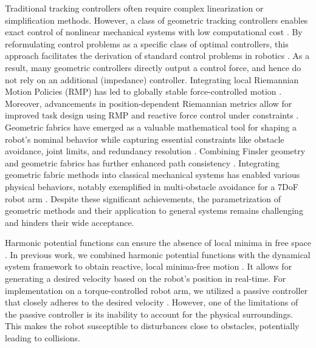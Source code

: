 Traditional tracking controllers often require complex linearization or simplification methods. However, a class of geometric tracking controllers enables exact control of nonlinear mechanical systems with low computational cost \parencite{udwadia2003new}. By reformulating control problems as a specific class of optimal controllers, this approach facilitates the derivation of standard control problems in robotics \parencite{peters2008unifying}. As a result, many geometric controllers directly output a control force, and hence do not rely on an additional (impedance) controller.
Integrating local Riemannian Motion Policies (RMP) has led to globally stable force-controlled motion \parencite{cheng2020rmp}. Moreover, advancements in position-dependent Riemannian metrics allow for improved task design using RMP and reactive force control under constraints \parencite{bylard2021composable}.
Geometric fabrics have emerged as a valuable mathematical tool for shaping a robot's nominal behavior while capturing essential constraints like obstacle avoidance, joint limits, and redundancy resolution \parencite{xie2020geometric}. Combining Finsler geometry and geometric fabrics has further enhanced path consistency \parencite{ratliff2021generalized}.
Integrating geometric fabric methods into classical mechanical systems has enabled various physical behaviors, notably exemplified in multi-obstacle avoidance for a 7DoF robot arm \parencite{van2022geometric}. Despite these significant achievements, the parametrization of geometric methods and their application to general systems remains challenging and hinders their wide acceptance.

Harmonic potential functions can ensure the absence of local minima in free space \parencite{connolly1997harmonic}. In previous work, we combined harmonic potential functions with the dynamical system framework to obtain reactive, local minima-free motion \parencite{huber2019avoidance, huber2023avoidance}. It allows for generating a desired velocity based on the robot's position in real-time.
For implementation on a torque-controlled robot arm, we utilized a passive controller that closely adheres to the desired velocity \parencite{kronander2015passive}. However, one of the limitations of the passive controller is its inability to  account for the physical surroundings. This makes the robot susceptible to disturbances close to obstacles, potentially leading to collisions.

